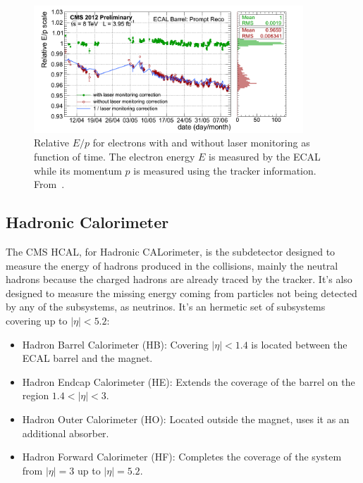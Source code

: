 \begin{figure}[!Hhtbp]
  \begin{center}
    \includegraphics[width=0.9\textwidth]{figs/EoverP_history_2012.png}
    \caption{Relative $E/p$ for electrons with and without laser monitoring as function of time. The electron energy $E$ is measured by the ECAL while its momentum $p$ is measured using the tracker information. From~\cite{CMS-DP-2012-015}.}
    \label{figs:RelEp}
  \end{center}
\end{figure}


\subsection{Hadronic Calorimeter}
\label{sec:hcal}

The CMS HCAL, for Hadronic CALorimeter, is the subdetector designed to measure the energy of hadrons produced in the collisions, mainly the neutral hadrons because the charged hadrons are already traced by the tracker. It's also designed to measure the missing energy coming from particles not being detected by any of the subsystems, as neutrinos. It's an hermetic set of subsystems covering up to $|\eta|<5.2$:
\begin{itemize}
\item Hadron Barrel Calorimeter (HB): Covering $|\eta|<1.4$ is located between the ECAL barrel and the magnet. 
\item Hadron Endcap Calorimeter (HE): Extends the coverage of the barrel on the region $1.4<|\eta|<3$.
\item Hadron Outer Calorimeter (HO): Located outside the magnet, uses it as an additional absorber.
\item Hadron Forward Calorimeter (HF): Completes the coverage of the system from $|\eta|=3$ up to $|\eta|=5.2$.
\end{itemize}

